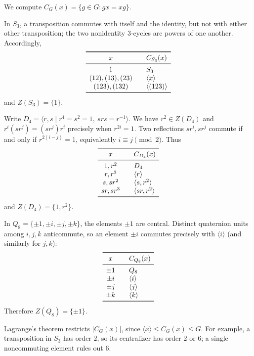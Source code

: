 \documentclass[11pt,oneside]{article}
\begin{document}
\begin{solution}
We compute $C_G(x)=\{g\in G:gx=xg\}$.

In $S_3$, a transposition commutes with itself and the identity, but not with either other transposition; the two nonidentity $3$-cycles are powers of one another. Accordingly,
\[
\begin{array}{c@{\qquad}l}\toprule
x&C_{S_3}(x)\\\midrule
1&S_3\\
(12),(13),(23)&\langle x\rangle\\
(123),(132)&\langle(123)\rangle\\\bottomrule\end{array}
\]
and $Z(S_3)=\{1\}$.

Write $D_4=\langle r,s\mid r^4=s^2=1,\ srs=r^{-1}\rangle$. We have $r^2\in Z(D_4)$ and $r^i(sr^j)=(sr^j)r^i$ precisely when $r^{2i}=1$. Two reflections $sr^i,sr^j$ commute if and only if $r^{2(i-j)}=1$, equivalently $i\equiv j\pmod2$. Thus
\[
\begin{array}{c@{\qquad}l}\toprule
x&C_{D_4}(x)\\\midrule
1,r^2&D_4\\
r,r^3&\langle r\rangle\\
s,sr^2&\langle s,r^2\rangle\\
sr,sr^3&\langle sr,r^2\rangle\\\bottomrule\end{array}
\]
and $Z(D_4)=\{1,r^2\}$.

In $Q_8=\{\pm1,\pm i,\pm j,\pm k\}$, the elements $\pm1$ are central. Distinct quaternion units among $i,j,k$ anticommute, so an element $\pm i$ commutes precisely with $\langle i\rangle$ (and similarly for $j,k$):
\[
\begin{array}{c@{\qquad}l}\toprule
x&C_{Q_8}(x)\\\midrule
\pm1&Q_8\\
\pm i&\langle i\rangle\\
\pm j&\langle j\rangle\\
\pm k&\langle k\rangle\\\bottomrule\end{array}
\]
Therefore $Z(Q_8)=\{\pm1\}$.

Lagrange's theorem restricts $|C_G(x)|$, since $\langle x\rangle\le C_G(x)\le G$. For example, a transposition in $S_3$ has order $2$, so its centralizer has order $2$ or $6$; a single noncommuting element rules out $6$.
\end{solution}
\end{document}
